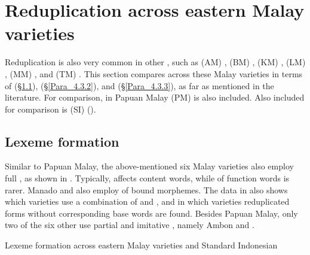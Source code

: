 {\section{Reduplication across eastern Malay varieties}
\label{Para_4.3}
Reduplication is also very common in other , such as  (AM) \citep[112–140]{vanMinde.1997},  (BM) \citep[160, 206]{Paauw.2009},  (KM) \citep[160, 171–173, 206, 252–253]{Paauw.2009},  (LM) \citep[161, 171–173, 206, 256–258]{Paauw.2009},  (MM) \citep[25–28]{Stoel.2005}, and  (TM) \cite[136–139]{Litamahuputty.2012}. This section compares  across these Malay varieties in terms of  (§\ref{Para_4.3.1}),  (§\ref{Para_4.3.2}), and  (§\ref{Para_4.3.3}), as far as mentioned in the literature. For comparison,  in Papuan Malay (PM) is also included. Also included for comparison is  (SI) (\citealt{MacDonald.1976, Mintz.2002, Sneddon.2010}).


\subsection{Lexeme formation}
\label{Para_4.3.1}
Similar to Papuan Malay, the above-mentioned six Malay varieties also employ full , as shown in . Typically,  affects content words, while  of function words is rarer. Manado and  also employ  of bound morphemes. The data in  also shows which varieties use a combination of  and , and in which varieties reduplicated forms without corresponding base words are found. Besides Papuan Malay, only two of the six other  use partial and imitative , namely Ambon and .


\begin{table}
\caption{ Lexeme formation across eastern Malay varieties and Standard Indonesian}\label{Table_4.8}


\end{table}}
